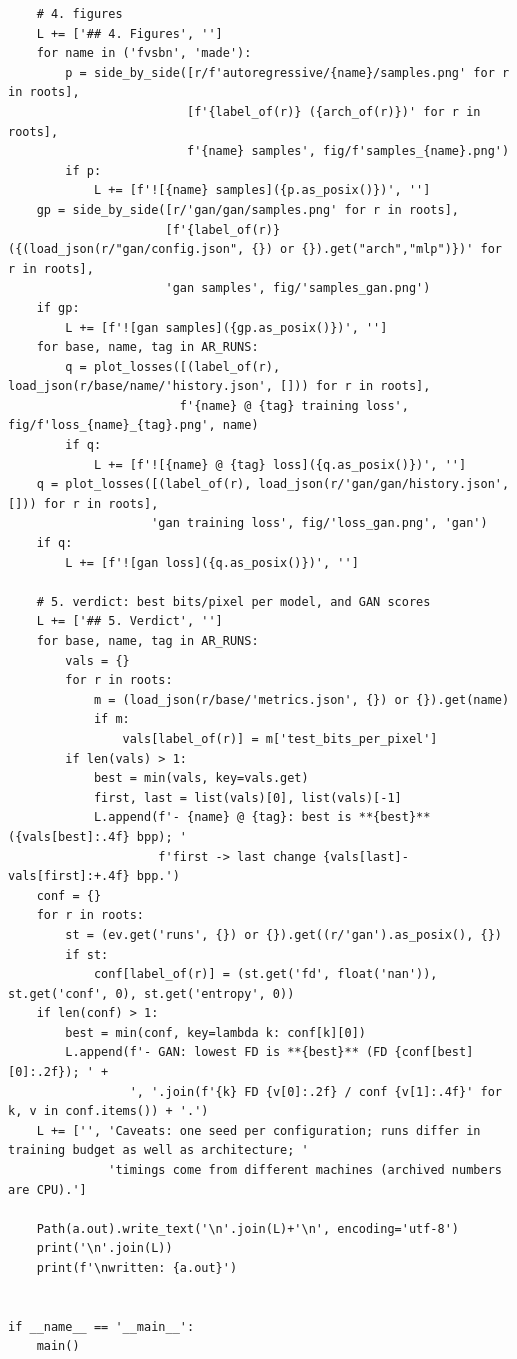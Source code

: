 \begin{lstlisting}
    # 4. figures
    L += ['## 4. Figures', '']
    for name in ('fvsbn', 'made'):
        p = side_by_side([r/f'autoregressive/{name}/samples.png' for r in roots],
                         [f'{label_of(r)} ({arch_of(r)})' for r in roots],
                         f'{name} samples', fig/f'samples_{name}.png')
        if p:
            L += [f'![{name} samples]({p.as_posix()})', '']
    gp = side_by_side([r/'gan/gan/samples.png' for r in roots],
                      [f'{label_of(r)} ({(load_json(r/"gan/config.json", {}) or {}).get("arch","mlp")})' for r in roots],
                      'gan samples', fig/'samples_gan.png')
    if gp:
        L += [f'![gan samples]({gp.as_posix()})', '']
    for base, name, tag in AR_RUNS:
        q = plot_losses([(label_of(r), load_json(r/base/name/'history.json', [])) for r in roots],
                        f'{name} @ {tag} training loss', fig/f'loss_{name}_{tag}.png', name)
        if q:
            L += [f'![{name} @ {tag} loss]({q.as_posix()})', '']
    q = plot_losses([(label_of(r), load_json(r/'gan/gan/history.json', [])) for r in roots],
                    'gan training loss', fig/'loss_gan.png', 'gan')
    if q:
        L += [f'![gan loss]({q.as_posix()})', '']

    # 5. verdict: best bits/pixel per model, and GAN scores
    L += ['## 5. Verdict', '']
    for base, name, tag in AR_RUNS:
        vals = {}
        for r in roots:
            m = (load_json(r/base/'metrics.json', {}) or {}).get(name)
            if m:
                vals[label_of(r)] = m['test_bits_per_pixel']
        if len(vals) > 1:
            best = min(vals, key=vals.get)
            first, last = list(vals)[0], list(vals)[-1]
            L.append(f'- {name} @ {tag}: best is **{best}** ({vals[best]:.4f} bpp); '
                     f'first -> last change {vals[last]-vals[first]:+.4f} bpp.')
    conf = {}
    for r in roots:
        st = (ev.get('runs', {}) or {}).get((r/'gan').as_posix(), {})
        if st:
            conf[label_of(r)] = (st.get('fd', float('nan')), st.get('conf', 0), st.get('entropy', 0))
    if len(conf) > 1:
        best = min(conf, key=lambda k: conf[k][0])
        L.append(f'- GAN: lowest FD is **{best}** (FD {conf[best][0]:.2f}); ' +
                 ', '.join(f'{k} FD {v[0]:.2f} / conf {v[1]:.4f}' for k, v in conf.items()) + '.')
    L += ['', 'Caveats: one seed per configuration; runs differ in training budget as well as architecture; '
              'timings come from different machines (archived numbers are CPU).']

    Path(a.out).write_text('\n'.join(L)+'\n', encoding='utf-8')
    print('\n'.join(L))
    print(f'\nwritten: {a.out}')


if __name__ == '__main__':
    main()
\end{lstlisting}

